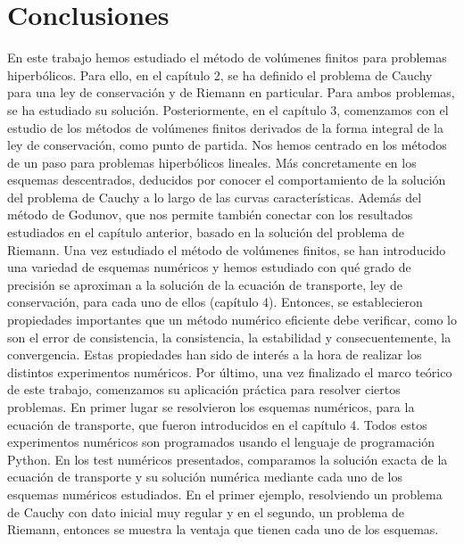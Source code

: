 \chapter{Conclusiones}\label{ch:conclusions}

En este trabajo hemos estudiado el método de volúmenes finitos para
problemas hiperbólicos.
Para ello, en el capítulo 2, se ha definido el problema de Cauchy
para una ley de conservación y de Riemann en particular.
Para ambos problemas, se ha estudiado su solución.
Posteriormente, en el capítulo 3, comenzamos con el estudio de los
métodos de volúmenes finitos derivados de la forma integral de la ley
de conservación, como punto de partida.
Nos hemos centrado en los métodos de un paso para problemas
hiperbólicos lineales.
Más concretamente en los esquemas descentrados, deducidos por conocer
el comportamiento de la solución del problema de Cauchy a lo largo de
las curvas características.
Además del método de Godunov, que nos permite también conectar con
los resultados estudiados en el capítulo anterior, basado en la
solución del problema de Riemann.
Una vez estudiado el método de volúmenes finitos, se han introducido
una variedad de esquemas numéricos y hemos estudiado con qué grado de
precisión se aproximan a la solución de la ecuación de transporte,
ley de conservación, para cada uno de ellos (capítulo 4).
Entonces, se establecieron propiedades importantes que un método
numérico eficiente debe verificar, como lo son el error de
consistencia, la consistencia, la estabilidad y consecuentemente, la
convergencia.
Estas propiedades han sido de interés a la hora de realizar los
distintos experimentos numéricos.
Por último, una vez finalizado el marco teórico de este trabajo,
comenzamos su aplicación práctica para resolver ciertos problemas.
En primer lugar se resolvieron los esquemas numéricos, para la
ecuación de transporte, que fueron introducidos en el capítulo 4.
Todos estos experimentos numéricos son programados usando el lenguaje
de programación Python.
En los test numéricos presentados, comparamos la solución exacta de
la ecuación de transporte y su solución numérica mediante cada uno de
los esquemas numéricos estudiados.
En el primer ejemplo, resolviendo un problema de Cauchy con dato
inicial muy regular y en el segundo, un problema de Riemann, entonces
se muestra la ventaja que tienen cada uno de los esquemas.